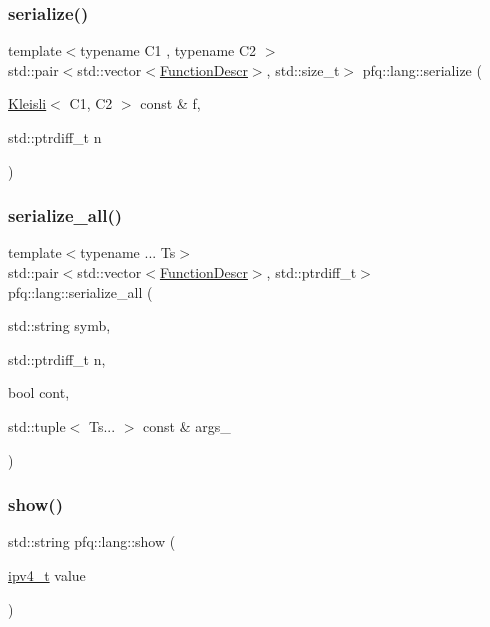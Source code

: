 \subsubsection{\texorpdfstring{serialize()}{serialize()}\hspace{0.1cm}{\footnotesize\ttfamily [6/6]}}
{\footnotesize\ttfamily template$<$typename C1 , typename C2 $>$ \\
std\+::pair$<$std\+::vector$<$\hyperlink{structpfq_1_1lang_1_1FunctionDescr}{Function\+Descr}$>$, std\+::size\+\_\+t$>$ pfq\+::lang\+::serialize (\begin{DoxyParamCaption}\item[{\hyperlink{structpfq_1_1lang_1_1Kleisli}{Kleisli}$<$ C1, C2 $>$ const \&}]{f,  }\item[{std\+::ptrdiff\+\_\+t}]{n }\end{DoxyParamCaption})\hspace{0.3cm}{\ttfamily [inline]}}

\mbox{\label{namespacepfq_1_1lang_acd7f9c34960d4f3511228a5568628acf}} 
\subsubsection{\texorpdfstring{serialize\+\_\+all()}{serialize\_all()}}
{\footnotesize\ttfamily template$<$typename ... Ts$>$ \\
std\+::pair$<$std\+::vector$<$\hyperlink{structpfq_1_1lang_1_1FunctionDescr}{Function\+Descr}$>$, std\+::ptrdiff\+\_\+t$>$ pfq\+::lang\+::serialize\+\_\+all (\begin{DoxyParamCaption}\item[{std\+::string}]{symb,  }\item[{std\+::ptrdiff\+\_\+t}]{n,  }\item[{bool}]{cont,  }\item[{std\+::tuple$<$ Ts... $>$ const \&}]{args\+\_\+ }\end{DoxyParamCaption})\hspace{0.3cm}{\ttfamily [inline]}}

\mbox{\label{namespacepfq_1_1lang_a6b371b706602987f7e45c7558824fa34}} 
\subsubsection{\texorpdfstring{show()}{show()}\hspace{0.1cm}{\footnotesize\ttfamily [1/8]}}
{\footnotesize\ttfamily std\+::string pfq\+::lang\+::show (\begin{DoxyParamCaption}\item[{\hyperlink{structpfq_1_1lang_1_1ipv4__t}{ipv4\+\_\+t}}]{value }\end{DoxyParamCaption})\hspace{0.3cm}{\ttfamily [inline]}}

